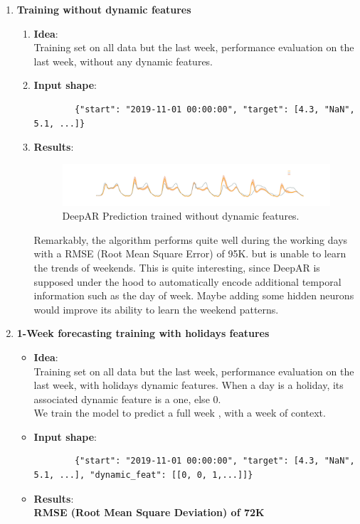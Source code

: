\begin{enumerate}
    \item \textbf{Training without dynamic features}
    \begin{enumerate}
        \item[] \textbf{Idea}:\\
        Training set on all data but the last week, performance evaluation on the last week, without any dynamic features.
        \item[] \textbf{Input shape}: \\
        \begin{lstlisting}
        {"start": "2019-11-01 00:00:00", "target": [4.3, "NaN", 5.1, ...]}
        \end{lstlisting}

        \item[] \textbf{Results}:\\
        \begin{figure}[h!]
            \centering
            \includegraphics[width=1\textwidth]{images/deepar_no_dyn.png}
            \caption{DeepAR Prediction trained without dynamic features.}
            \description{}
            \label{fig:deepar_no_dyn}
        \end{figure}
        Remarkably, the algorithm performs quite well during the working days with a RMSE (Root Mean Square Error) of 95K. but is unable to learn the trends of weekends. This is quite interesting, since DeepAR is supposed under the hood to automatically encode additional temporal information such as the day of week. Maybe adding some hidden neurons would improve its ability to learn the weekend patterns.
        
    \end{enumerate}
    
    \item \textbf{1-Week forecasting training with holidays features}
    \begin{itemize}
        \item[] \textbf{Idea}:\\
        Training set on all data but the last week, performance evaluation on the last week, with holidays dynamic features. When a day is a holiday, its associated dynamic feature is a one, else 0. \\
        We train the model to predict a full week , with a week of context.
        \item[] \textbf{Input shape}:\\
        \begin{lstlisting}
        {"start": "2019-11-01 00:00:00", "target": [4.3, "NaN", 5.1, ...], "dynamic_feat": [[0, 0, 1,...]]}
        \end{lstlisting}
        \item[] \textbf{Results}:\\
        \textbf{RMSE (Root Mean Square Deviation) of 72K}
    \end{itemize}
    

\end{enumerate}
